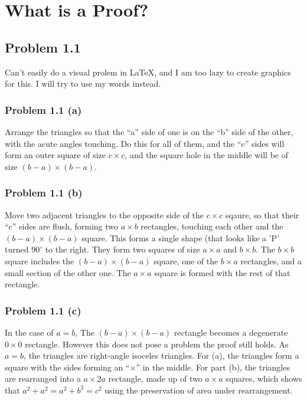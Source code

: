 \documentclass{article}
\begin{document}
\section{What is a Proof?}
\subsection{Problem 1.1}
Can't easily do a visual prolem in \LaTeX, and I am too lazy to create graphics for this. I will try to use my words instead.
\subsubsection{Problem 1.1 (a)}
Arrange the triangles so that the ``a'' side of one is on the ``b'' side of the other, with the acute angles touching. Do this for all of them, and the ``c'' sides will form an outer square of size $c\times c$, and the square hole in the middle will be of size $(b-a)\times(b-a)$.
\subsubsection{Problem 1.1 (b)}
Move two adjacent triangles to the opposite side of the $c\times c$ sqaure, so that their ``c'' sides are flush, forming two $a\times b$ rectangles, touching each other and the $(b-a)\times(b-a)$ square. This forms a single shape (that looks like a 'P' turned $90^{\circ}$ to the right. They form two squares of size $a\times a$ and $b\times b$. The $b\times b$ square includes the $(b-a)\times(b-a)$ square, one of the $b\times a$ rectangles, and a small section of the other one. The $a\times a$ square is formed with the rest of that rectangle.
\subsubsection{Problem 1.1 (c)}
In the case of $a=b$, The $(b-a)\times(b-a)$ rectangle becomes a degenerate $0\times0$ rectangle. However this does not pose a problem the proof still holds. As $a=b$, the triangles are right-angle isoceles triangles. For (a), the triangles form a square with the sides forming an ``$\times$'' in the middle. For part (b), the triangles are rearranged into a $a\times2a$ rectangle, made up of two $a\times a$ squares, which shows that $a^2 + a^2 = a^2 + b^2 = c^2$ using the preservation of area under rearrangement.
\end{document}
